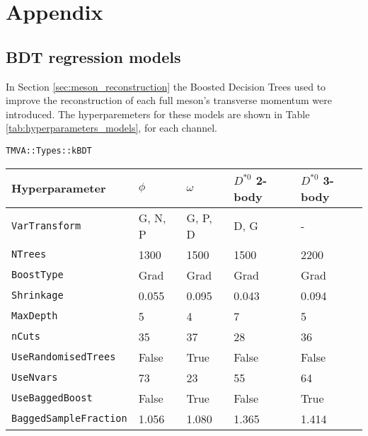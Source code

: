 \chapter*{Appendix}\label{chap:appendix}

\section*{BDT regression models}\label{sec:appendix_models}

In Section \ref{sec:meson_reconstruction} the Boosted Decision Trees used to improve the reconstruction of each full meson's transverse momentum were introduced. The hyperparemeters for these models are shown in Table \ref{tab:hyperparameters_models}, for each channel.

\begin{table}[!ht]
    \begin{lrbox}{\verbbox}
        \footnotesize
        \verb+TMVA::Types::kBDT+
    \end{lrbox}
    \centering
    \begin{tabular}{|l|C{2.45cm}|C{2.45cm}|C{2.45cm}|C{2.45cm}|}
        \hline
        Hyperparameter & $\phi$ & $\omega$ & $D^{*0}$ 2-body & $D^{*0}$ 3-body \\ \hline
        \verb+VarTransform+         &G, N, P&G, P, D&D, G   &-    \\
        \verb+NTrees+               &1300   &1500   &1500   &2200    \\
        \verb+BoostType+            &Grad   &Grad   &Grad   &Grad    \\
        \verb+Shrinkage+            &0.055  &0.095  &0.043  &0.094    \\
        \verb+MaxDepth+             &5      &4      &7      &5    \\
        \verb+nCuts+                &35     &37     &28     &36    \\
        \verb+UseRandomisedTrees+   &False   &True   &False   &False    \\
        \verb+UseNvars+             &73     &23     &55     &64    \\
        \verb+UseBaggedBoost+       &False  &True  &False   &True    \\
        \verb+BaggedSampleFraction+ &1.056  &1.080  &1.365 &1.414    \\

\end{tabular}
\end{table}
